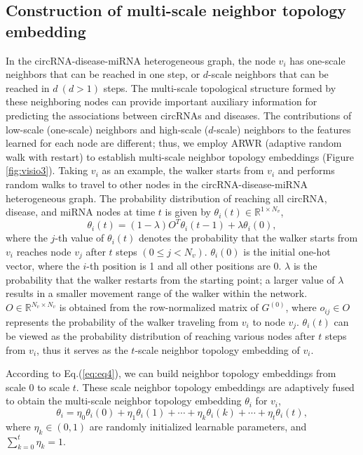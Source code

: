 \documentclass{bioinfo}
\begin{document}
\begin{methods}
\subsection{Construction of multi-scale neighbor topology embedding}
In the circRNA-disease-miRNA heterogeneous graph, the node $v_i$ has one-scale neighbors that can be reached in one step, or $d$-scale neighbors that can be reached in $d\ (d > 1)$ steps. The multi-scale topological structure formed by these neighboring nodes can provide important auxiliary information for predicting the associations between circRNAs and diseases. The contributions of low-scale (one-scale) neighbors and high-scale ($d$-scale) neighbors to the features learned for each node are different; thus, we employ ARWR (adaptive random walk with restart) to establish multi-scale neighbor topology embeddings (Figure \ref{fig:visio3}). Taking $v_i$ as an example, the walker starts from $v_i$ and performs random walks to travel to other nodes in the circRNA-disease-miRNA heterogeneous graph. The probability distribution of reaching all circRNA, disease, and miRNA nodes at time $t$ is given by $\theta _i{(t)} \in \mathbb{R}^{1 \times N_v}$,
\begin{equation}
\theta _i{(t)} = (1 - \lambda) O^T \theta _i{(t-1)} + \lambda \theta _i{(0)},
\label{eq:eq4}
\end{equation}
where the $j$-th value of $\theta _i{(t)}$ denotes the probability that the walker starts from $v_i$ reaches node $v_j$ after $t$ steps $(0 \leqslant j < N_v)$. $\theta _i{(0)}$ is the initial one-hot vector, where the $i$-th position is 1 and all other positions are 0. $\lambda$ is the probability that the walker restarts from the starting point; a larger value of $\lambda$ results in a smaller movement range of the walker within the network. $O \in \mathbb{R}^{N_v \times N_v}$ is obtained from the row-normalized matrix of $G^{(0)}$, where $o_{ij} \in O$ represents the probability of the walker traveling from $v_i$ to node $v_j$. $\theta _i{(t)}$ can be viewed as the probability distribution of reaching various nodes after $t$ steps from $v_i$, thus it serves as the $t$-scale neighbor topology embedding of $v_i$.

According to Eq.(\ref{eq:eq4}), we can build neighbor topology embeddings from scale 0 to scale $t$. These scale neighbor topology embeddings are adaptively fused to obtain the multi-scale neighbor topology embedding $\theta _i$ for $v_i$,
\begin{equation}
\theta _i = \eta_0  \theta _i{(0)} + \eta_1 \theta _i{(1)} + \cdots + \eta_k \theta _i{(k)} + \cdots + \eta_t \theta _i{(t)},
\end{equation}
where $\eta_k \in (0, 1)$ are randomly initialized learnable parameters, and $\sum_{k=0}^{t}\eta_k = 1$.


\end{methods}
\end{document}
